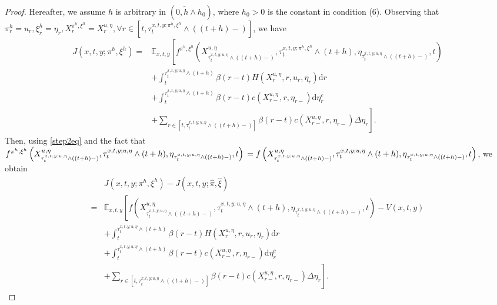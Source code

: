 \documentclass[10pt,a4paper]{amsart}
\begin{document}
\begin{proof}
Hereafter, we assume $h$ is arbitrary in $(0,\tilde{h}\wedge h_0)$, where $h_0>0$ is the constant in condition (6). Observing that $\pi^{h}_{r}=u_{r}, \xi^{h}_{r}=\eta_{r}, X^{\pi^{h},\xi^{h}}_r=X^{u,\eta}_r, \forall r\in[t,\tau^{x,t,y;\pi^{h},\xi^{h}}_{t}\wedge((t+h)-)]$, we have 
\begin{equation}
\begin{aligned}
J\left(x,t,y;\pi^{h},\xi^{h}\right)=&\mathbb{E}_{x,t,y}\left[f^{\pi^{h},\xi^{h}}\left(X^{u,\eta}_{\tau^{x,t,y;u,\eta}_{t}\wedge((t+h)-)},\tau^{x,t,y;\pi^{h},\xi^{h}}_{t}\wedge(t+h),\eta_{\tau^{x,t,y;u,\eta}_{t}\wedge((t+h)-)},t\right)\right.\\
  &\left.+\int_{t}^{\tau^{x,t,y;u,\eta}_{t}\wedge(t+h)}\beta(r-t) H\left(X^{u,\eta}_r, r,u_r, \eta_r \right) \mathrm{d} r \right.\\
  &\left.+\int_{t}^{\tau^{x,t,y;u,\eta}_{t}\wedge(t+h)}\beta(r-t) c\left(X^{u,\eta}_{r-}, r, \eta_{r-}\right) \mathrm{d}\eta^{c}_r\right.\\
  &\left.+\sum\limits_{r\in[t,\tau^{x,t,y;u,\eta}_{t}\wedge((t+h)-)]}\beta(r-t) c\left(X^{u,\eta}_{r-}, r, \eta_{r-}\right) \Delta\eta_r\right].
\end{aligned}\nonumber\end{equation}
Then, using \eqref{step2eq} and the fact that $f^{\pi^{h},\xi^{h}}\left(X^{u,\eta}_{\tau^{x,t,y;u,\eta}_{t}\wedge((t+h)-)},\tau^{x,t,y;u,\eta}_{t}\wedge(t+h),\eta_{\tau^{x,t,y;u,\eta}_{t}\wedge((t+h)-)},t\right)\\=f\left(X^{u,\eta}_{\tau^{x,t,y;u,\eta}_{t}\wedge((t+h)-)},\tau^{x,t,y;u,\eta}_{t}\wedge(t+h),\eta_{\tau^{x,t,y;u,\eta}_{t}\wedge((t+h)-)},t\right)$, we obtain
\begin{equation}
\begin{aligned}
&J\left(x,t,y;\pi^{h},\xi^{h}\right)-J\left(x,t,y;\hat\pi,\hat\xi\right)\\
=&\mathbb{E}_{x,t,y}\left[f\left(X^{u,\eta}_{\tau^{x,t,y;u,\eta}_{t}\wedge((t+h)-)},\tau^{x,t,y;u,\eta}_{t}\wedge(t+h),\eta_{\tau^{x,t,y;u,\eta}_{t}\wedge((t+h)-)},t\right)-V(x,t,y)\right.\\
  &\left.+\int_{t}^{\tau^{x,t,y;u,\eta}_{t}\wedge(t+h)}\beta(r-t) H\left(X^{u,\eta}_r, r,u_r, \eta_r \right) \mathrm{d} r \right.\\
  &\left.+\int_{t}^{\tau^{x,t,y;u,\eta}_{t}\wedge(t+h)}\beta(r-t) c\left(X^{u,\eta}_{r-}, r, \eta_{r-}\right) \mathrm{d}\eta^{c}_r\right.\\
  &\left.+\sum\limits_{r\in[t,\tau^{x,t,y;u,\eta}_{t}\wedge((t+h)-)]}\beta(r-t) c\left(X^{u,\eta}_{r-}, r, \eta_{r-}\right) \Delta\eta_r\right].
\end{aligned}\nonumber\end{equation}


\end{proof}
\end{document}
